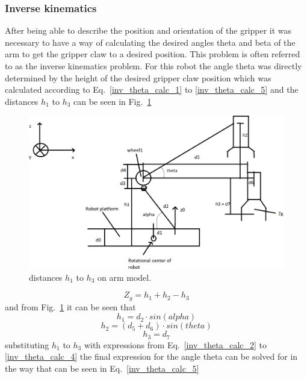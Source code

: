 \subsubsection{Inverse kinematics}
\label{sec:simon4}
After being able to describe the position and orientation of the gripper it was necessary to have a way of calculating the desired angles theta and beta of the arm to get the gripper claw to a desired position. This problem is often referred to as the inverse kinematics problem. For this robot the angle theta was directly determined by the height of the desired gripper claw position which was calculated according to Eq.~\eqref{inv_theta_calc_1} to \ref{inv_theta_calc_5} and the distances \(h_1\) to \(h_3\) can be seen in Fig.~\ref{inv_theta_img}
\begin{figure}[h]
    \centering
    \includegraphics[width=\linewidth]{sections/assets/Arm_model_inv_theta.png}
    \caption{distances \(h_1\) to \(h_3\) on arm model.}
    \label{inv_theta_img}
\end{figure}
\begin{equation}
    Z_g = h_1+h_2 - h_3
    \label{inv_theta_calc_1}
\end{equation}
and from Fig.~\ref{inv_theta_img} it can be seen that
\begin{equation}
    h_1 = d_2 \cdot sin(alpha)
    \label{inv_theta_calc_2}
\end{equation}
\begin{equation}
    h_2 = (d_5 + d_6) \cdot sin(theta)
    \label{inv_theta_calc_3}
\end{equation}
\begin{equation}
    h_3 = d_7
    \label{inv_theta_calc_4}
\end{equation}
substituting \(h_1\) to \(h_3\) with expressions from Eq.~\eqref{inv_theta_calc_2} to \eqref{inv_theta_calc_4} the final expression for the angle theta can be solved for in the way that can be seen in Eq.~\eqref{inv_theta_calc_5}
